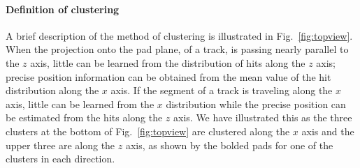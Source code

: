 \documentclass[review]{elsarticle}
\begin{document}
\paragraph{Definition of clustering}
A brief description of the method of clustering is illustrated in Fig.~\ref{fig:topview}. When the projection onto the pad plane, of a track, is passing nearly parallel to the $z$ axis, little can be learned from the distribution of hits along the $z$ axis; precise position information can be obtained from the mean value of the hit distribution along the $x$ axis. If the segment of a track is traveling along the $x$ axis, little can be learned from the $x$ distribution while the precise position can be estimated from the hits along the $z$ axis. We have illustrated this as the three clusters at the bottom of Fig.~\ref{fig:topview} are clustered along the $x$ axis and the upper three are along the $z$ axis, as shown by the bolded pads for one of the clusters in each direction.
\end{document}
